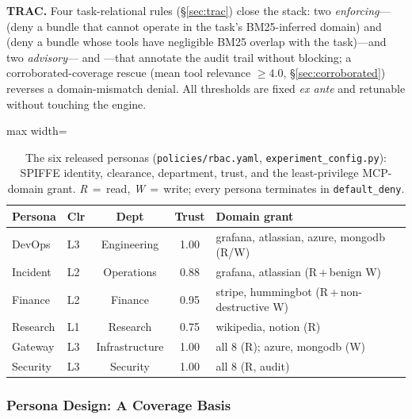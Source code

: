\documentclass[sigconf,review,anonymous]{acmart}
\begin{document}
\textbf{TRAC.} Four task-relational rules (\S\ref{sec:trac}) close the stack: two \emph{enforcing}--- (deny a bundle that cannot operate in the task's BM25-inferred domain) and  (deny a bundle whose tools have negligible BM25 overlap with the task)---and two \emph{advisory}--- and ---that annotate the audit trail without blocking; a corroborated-coverage rescue (mean tool relevance $\geq 4.0$, \S\ref{sec:corroborated}) reverses a domain-mismatch denial. All thresholds are fixed \emph{ex ante} and retunable without touching the engine.

\begin{table}[!t]
\centering
\caption{The six released personas (\texttt{policies/rbac.yaml}, \texttt{experiment\_config.py}): SPIFFE identity, clearance, department, trust, and the least-privilege MCP-domain grant. \emph{R}\,$=$\,read, \emph{W}\,$=$\,write; every persona terminates in \texttt{default\_deny}.}
\label{tab:personas}
\footnotesize
\setlength{\tabcolsep}{4pt}
\begin{adjustbox}{max width=\columnwidth}
\begin{tabular}{@{}llccl@{}}
\toprule
\textbf{Persona} & \textbf{Clr} & \textbf{Dept} & \textbf{Trust} & \textbf{Domain grant} \\
\midrule
DevOps    & L3 & Engineering    & 1.00 & grafana, atlassian, azure, mongodb (R/W) \\
Incident  & L2 & Operations     & 0.88 & grafana, atlassian (R\,$+$\,benign W) \\
Finance   & L2 & Finance        & 0.95 & stripe, hummingbot (R\,$+$\,non-destructive W) \\
Research  & L1 & Research       & 0.75 & wikipedia, notion (R) \\
Gateway   & L3 & Infrastructure & 1.00 & all 8 (R); azure, mongodb (W) \\
Security  & L3 & Security       & 1.00 & all 8 (R, audit) \\
\bottomrule
\end{tabular}
\end{adjustbox}
\end{table}

\subsubsection{Persona Design: A Coverage Basis}
\label{sec:persona_rationale}
\end{document}
